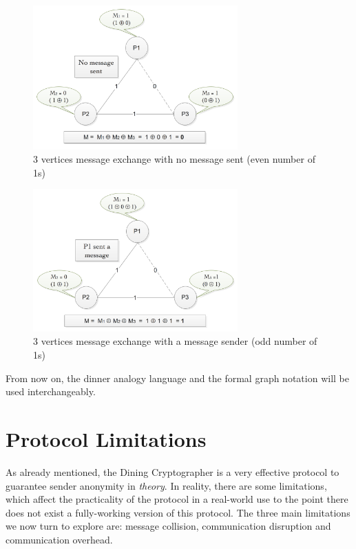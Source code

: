 \begin{figure}[h!]
    \centering
    \includegraphics[width=0.70\textwidth]{Images/DCFormalNoMessage.png}
    \caption{3 vertices message exchange with no message sent (even number of 1s)}
    \label{fig:dcFormalnoMessage}
\end{figure}

\begin{figure}[h!]
    \centering
    \includegraphics[width=0.70\textwidth]{Images/DCFormalWithMessage.png}
    \caption{3 vertices message exchange with a message sender (odd number of 1s)}
    \label{fig:dcFormalWithMessage}
\end{figure}

From now on, the dinner analogy language and the formal graph notation will be used interchangeably. \newline \newline \newline

\section{Protocol Limitations} \label{sec:limitations}
As already mentioned, the Dining Cryptographer is a very effective protocol to guarantee sender anonymity in \textit{theory}. In reality, there are some limitations, which affect the practicality of the protocol in a real-world use to the point there does not exist a fully-working version of this protocol.
The three main limitations we now turn to explore are: message collision, communication disruption and communication overhead. 

